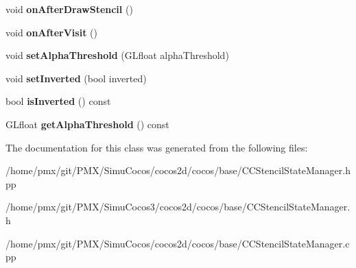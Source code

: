 \begin{DoxyCompactItemize}
void {\bfseries on\+After\+Draw\+Stencil} ()
\item 
\mbox{\label{classStencilStateManager_a4c4d3710f14803aaa96de5e5d1d6b31c}} 
void {\bfseries on\+After\+Visit} ()
\item 
\mbox{\label{classStencilStateManager_a4f390721473ab5c62b814cf77e90eaa4}} 
void {\bfseries set\+Alpha\+Threshold} (G\+Lfloat alpha\+Threshold)
\item 
\mbox{\label{classStencilStateManager_a68f2d10edc7e248db9abc3d5bd3bf8d3}} 
void {\bfseries set\+Inverted} (bool inverted)
\item 
\mbox{\label{classStencilStateManager_ab23f89330a5a8da08949826b84874ede}} 
bool {\bfseries is\+Inverted} () const
\item 
\mbox{\label{classStencilStateManager_a74774c4831b27c763042d9340d9bd4a1}} 
G\+Lfloat {\bfseries get\+Alpha\+Threshold} () const
\end{DoxyCompactItemize}


The documentation for this class was generated from the following files\+:\begin{DoxyCompactItemize}
\item 
/home/pmx/git/\+P\+M\+X/\+Simu\+Cocos/cocos2d/cocos/base/C\+C\+Stencil\+State\+Manager.\+hpp\item 
/home/pmx/git/\+P\+M\+X/\+Simu\+Cocos3/cocos2d/cocos/base/C\+C\+Stencil\+State\+Manager.\+h\item 
/home/pmx/git/\+P\+M\+X/\+Simu\+Cocos/cocos2d/cocos/base/C\+C\+Stencil\+State\+Manager.\+cpp\end{DoxyCompactItemize}
